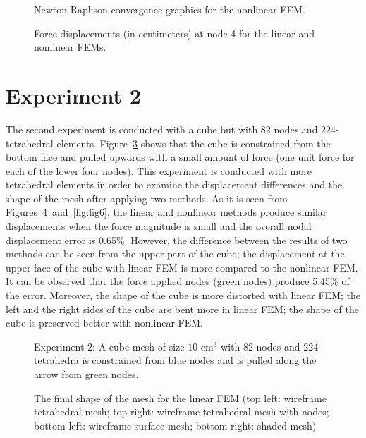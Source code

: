 \begin{figure}
\centerline{}
\caption{Newton-Raphson convergence graphics for the nonlinear FEM.}
\label{fig:conv}
\end{figure}


\begin{figure}[h]
\centerline{}
\caption{Force displacements (in centimeters) at node 4 for the linear and nonlinear FEMs.}
\label{fig:epsFEM}
\end{figure}

\clearpage
\section{Experiment 2}
\label{ii}

The second experiment is conducted with a cube but with 82 nodes and 224-tetrahedral elements. Figure~\ref{fig:fig4} shows that the cube is constrained from the bottom face and pulled upwards with a small amount of force (one unit force for each of the lower four nodes). This experiment is conducted with more tetrahedral elements in order to examine the displacement differences and the shape of the mesh after applying two methods. As it is seen from Figures~\ref{fig:fig5}~and~\ref{fig:fig6}, the linear and nonlinear methods produce similar displacements when the force magnitude is small and the overall nodal displacement error is 0.65\%. However, the difference between the results of two methods can be seen from the upper part of the cube; the displacement at the upper face of the cube with linear FEM is more compared to the nonlinear FEM. It can be observed that the force applied nodes (green nodes) produce 5.45\% of the error. Moreover, the shape of the cube is more distorted with linear FEM; the left and the right sides of the cube are bent more in linear FEM; the shape of the cube is preserved better with nonlinear FEM.

\begin{figure}[h]
\centerline{}
\caption{Experiment 2: A cube mesh of size $10$ cm$^{3}$ with 82 nodes and 224-tetrahedra  is constrained from blue nodes and is pulled along the arrow from green nodes.}
\label{fig:fig4}
\end{figure}

\begin{figure}[h]
\centerline{}
\caption{The final shape of the mesh for the linear FEM (top left: wireframe tetrahedral mesh; top right: wireframe tetrahedral mesh with nodes; bottom left: wireframe surface mesh; bottom right: shaded mesh)}
\label{fig:fig5}
\end{figure}

